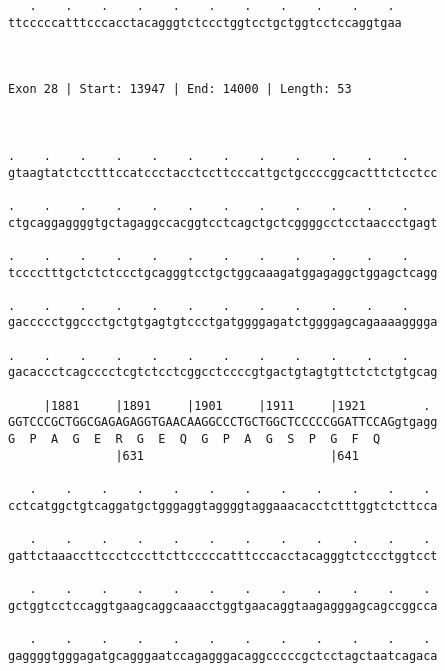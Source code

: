 \documentclass{article}
\begin{document}
\begin{Verbatim}
   .    .    .    .    .    .    .    .    .    .    . 
ttcccccatttcccacctacagggtctccctggtcctgctggtcctccaggtgaa
                                                       
                                                       
 
Exon 28 | Start: 13947 | End: 14000 | Length: 53



.    .    .    .    .    .    .    .    .    .    .    .    
gtaagtatctcctttccatccctacctccttcccattgctgccccggcactttctcctcc
                                                            
.    .    .    .    .    .    .    .    .    .    .    .    
ctgcaggaggggtgctagaggccacggtcctcagctgctcggggcctcctaaccctgagt
                                                            
.    .    .    .    .    .    .    .    .    .    .    .    
tcccctttgctctctccctgcagggtcctgctggcaaagatggagaggctggagctcagg
                                                            
.    .    .    .    .    .    .    .    .    .    .    .    
gaccccctggccctgctgtgagtgtccctgatggggagatctggggagcagaaaagggga
                                                            
.    .    .    .    .    .    .    .    .    .    .    .    
gacaccctcagcccctcgtctcctcggcctccccgtgactgtagtgttctctctgtgcag
                                                            
     |1881     |1891     |1901     |1911     |1921        . 
GGTCCCGCTGGCGAGAGAGGTGAACAAGGCCCTGCTGGCTCCCCCGGATTCCAGgtgagg
G  P  A  G  E  R  G  E  Q  G  P  A  G  S  P  G  F  Q        
               |631                          |641           
  
   .    .    .    .    .    .    .    .    .    .    .    . 
cctcatggctgtcaggatgctgggaggtaggggtaggaaacacctctttggtctcttcca
                                                            
   .    .    .    .    .    .    .    .    .    .    .    . 
gattctaaaccttccctcccttcttcccccatttcccacctacagggtctccctggtcct
                                                            
   .    .    .    .    .    .    .    .    .    .    .    . 
gctggtcctccaggtgaagcaggcaaacctggtgaacaggtaagagggagcagccggcca
                                                            
   .    .    .    .    .    .    .    .    .    .    .    . 
gaggggtgggagatgcagggaatccagagggacaggcccccgctcctagctaatcagaca
                                                            

\end{Verbatim}
\end{document}
